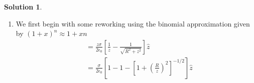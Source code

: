 \documentclass[10pt]{article}
\theoremstyle{definition}
\newtheorem{soln}{Solution}
\newcommand{\uz}{\hat{z}}
\newcommand{\primed}[1]{#1^\prime}
\begin{document}
\begin{soln}
\begin{enumerate}[label=(\alph*)]
\begin{align*}
             & = \frac{\sigma}{4\pi\epsilon_0}\int_0^{2\pi}\int_0^R\frac{(-\primed{r}\cos\theta,-\primed{r}\sin\theta,z)}{\left({\primed{r}}^2+z^2\right)^{3/2}}\primed{r}d\primed{r}d\theta \quad \text{Integrating w.r.t \theta\,kills the sin and cos by symmetry} \\
             & = \frac{\sigma}{4\pi\epsilon_0}\int_{0=\primed{r}}^R\frac{(0,0,2\pi z)}{2u^{3/2}}du\rightsquigarrow u={\primed{r}}^2+z^2\implies du/2\primed{r}=d\primed{r}                                                                          \\
             & = \frac{\sigma}{4\epsilon_0}\int_{0=\primed{r}}^R\frac{(0,0,z)}{u^{3/2}}du                                                                                                                                                           \\
             & = -\frac{z\sigma}{2\epsilon_0}{\left[\left({\primed{r}}^2+z^2\right)^{-1/2}\right]}_{0}^{R}\uz=\frac{z\sigma}{2\epsilon_0}\left[\frac{1}{\abs{z}}-\frac{1}{\sqrt{R^2+z^2}}\right]\uz                                                 \\
          \end{align*}
          For boundary conditions 
          \begin{align*}
            \mathbf{E}_{above}-\mathbf{E}_{below} & = \frac{z\sigma}{2\epsilon_0}\left[\frac{1}{z}-\frac{1}{\sqrt{R^2+z^2}}+\frac{1}{z}+\frac{1}{\sqrt{R^2+z^2}}\right]\uz \\
                                                  & = \frac{z\sigma}{2\epsilon_0}\left[\frac{2}{z}\right]\uz                                                               \\
                                                  & = \frac{\sigma}{\epsilon_0}\uz                                                                                         \\
          \end{align*}
          Which satisfies equation 2.33 as $\uz$ here is our normal vector.
    \item We first begin with some reworking using the binomial approximation given by $(1+x)^n\approx 1+xn$
          \begin{align*}
             & =\frac{z\sigma}{2\epsilon_0}\left[\frac{1}{z}-\frac{1}{\sqrt{R^2+z^2}}\right]\uz                \\
             & =\frac{\sigma}{2\epsilon_0}\left[1-1-\left[1+\left(\frac{R}{z}\right)^2\right]^{-1/2}\right]\uz \\

\end{align*}
\end{enumerate}
\end{soln}
\end{document}
